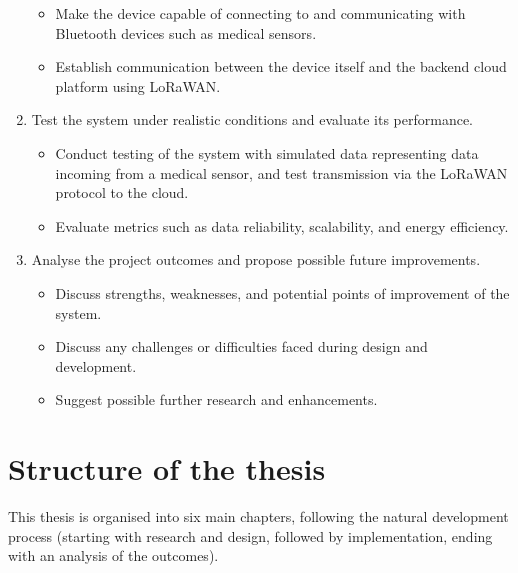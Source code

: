 \begin{enumerate}
\begin{itemize}
		\item Make the device capable of connecting to and communicating with Bluetooth devices such as medical sensors.
		\item Establish communication between the device itself and the backend cloud platform using LoRaWAN.
	\end{itemize}
	\item Test the system under realistic conditions and evaluate its performance.
	\begin{itemize}
		\item Conduct testing of the system with simulated data representing data incoming from a medical sensor, and test transmission via the LoRaWAN protocol to the cloud.
		\item Evaluate metrics such as data reliability, scalability, and energy efficiency.
	\end{itemize}
	\item Analyse the project outcomes and propose possible future improvements.
	\begin{itemize}
		\item Discuss strengths, weaknesses, and potential points of improvement of the system.
		\item Discuss any challenges or difficulties faced during design and development.
		\item Suggest possible further research and enhancements.
	\end{itemize}
\end{enumerate}

\section{Structure of the thesis} %
This thesis is organised into six main chapters, following the natural development process (starting with research and design, followed by implementation, ending with an analysis of the outcomes).

